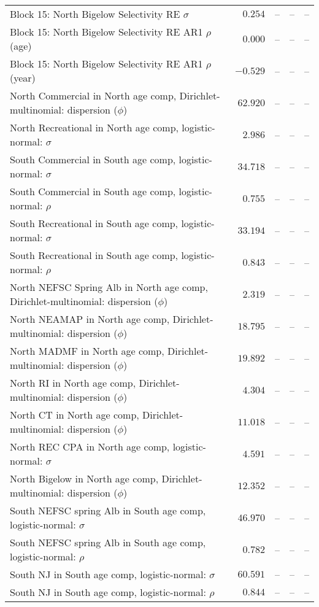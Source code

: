 \documentclass[
]{article}
\begin{document}
\begin{landscape}
\begin{longtable}[t]{lrrrr}
Block 15: North Bigelow Selectivity RE $\sigma$ & $0.254$ & -- & -- & --\\
Block 15: North Bigelow Selectivity RE AR1 $\rho$ (age) & $0.000$ & -- & -- & --\\
\addlinespace
Block 15: North Bigelow Selectivity RE AR1 $\rho$ (year) & $-0.529$ & -- & -- & --\\
North Commercial in North age comp, Dirichlet-multinomial: dispersion ($\phi$) & $62.920$ & -- & -- & --\\
North Recreational in North age comp, logistic-normal: $\sigma$ & $2.986$ & -- & -- & --\\
South Commercial in South age comp, logistic-normal: $\sigma$ & $34.718$ & -- & -- & --\\
South Commercial in South age comp, logistic-normal: $\rho$ & $0.755$ & -- & -- & --\\
\addlinespace
South Recreational in South age comp, logistic-normal: $\sigma$ & $33.194$ & -- & -- & --\\
South Recreational in South age comp, logistic-normal: $\rho$ & $0.843$ & -- & -- & --\\
North NEFSC Spring Alb in North age comp, Dirichlet-multinomial: dispersion ($\phi$) & $2.319$ & -- & -- & --\\
North NEAMAP in North age comp, Dirichlet-multinomial: dispersion ($\phi$) & $18.795$ & -- & -- & --\\
North MADMF in North age comp, Dirichlet-multinomial: dispersion ($\phi$) & $19.892$ & -- & -- & --\\
\addlinespace
North RI in North age comp, Dirichlet-multinomial: dispersion ($\phi$) & $4.304$ & -- & -- & --\\
North CT in North age comp, Dirichlet-multinomial: dispersion ($\phi$) & $11.018$ & -- & -- & --\\
North REC CPA in North age comp, logistic-normal: $\sigma$ & $4.591$ & -- & -- & --\\
North Bigelow in North age comp, Dirichlet-multinomial: dispersion ($\phi$) & $12.352$ & -- & -- & --\\
South NEFSC spring Alb in South age comp, logistic-normal: $\sigma$ & $46.970$ & -- & -- & --\\
\addlinespace
South NEFSC spring Alb in South age comp, logistic-normal: $\rho$ & $0.782$ & -- & -- & --\\
South NJ in South age comp, logistic-normal: $\sigma$ & $60.591$ & -- & -- & --\\
South NJ in South age comp, logistic-normal: $\rho$ & $0.844$ & -- & -- & --\\

\end{longtable}
\end{landscape}
\end{document}
